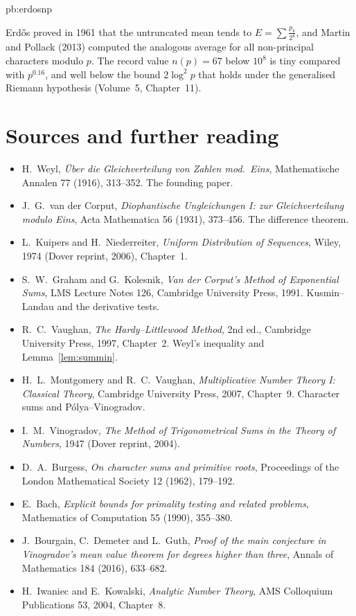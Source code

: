 \begin{solution}{pb:erdosnp}

\leads Erd\H os proved in 1961 that the untruncated mean tends to $E=\sum\frac{p_k}{2^k}$, and Martin and Pollack (2013) computed the analogous average for all non-principal characters
modulo $p$. The record value $n(p)=67$ below $10^8$ is tiny compared with $p^{0.16}$, and well below the bound $2\log^2p$ that holds under the generalised Riemann hypothesis
(Volume~5, Chapter~11).
\end{solution}

\section*{Sources and further reading}

\begin{itemize}
\item H.~Weyl, \emph{Über die Gleichverteilung von Zahlen mod.\ Eins}, Mathematische Annalen 77 (1916), 313--352. The founding paper.
\item J.~G.~van der Corput, \emph{Diophantische Ungleichungen I: zur Gleichverteilung modulo Eins}, Acta Mathematica 56 (1931), 373--456. The difference theorem.
\item L.~Kuipers and H.~Niederreiter, \emph{Uniform Distribution of Sequences}, Wiley, 1974 (Dover reprint, 2006), Chapter~1.
\item S.~W.~Graham and G.~Kolesnik, \emph{Van der Corput's Method of Exponential Sums}, LMS Lecture Notes 126, Cambridge University Press, 1991. Kusmin--Landau and the derivative tests.
\item R.~C.~Vaughan, \emph{The Hardy--Littlewood Method}, 2nd ed., Cambridge University Press, 1997, Chapter~2. Weyl's inequality and Lemma~\ref{lem:summin}.
\item H.~L.~Montgomery and R.~C.~Vaughan, \emph{Multiplicative Number Theory I: Classical Theory}, Cambridge University Press, 2007, Chapter~9. Character sums and Pólya--Vinogradov.
\item I.~M.~Vinogradov, \emph{The Method of Trigonometrical Sums in the Theory of Numbers}, 1947 (Dover reprint, 2004).
\item D.~A.~Burgess, \emph{On character sums and primitive roots}, Proceedings of the London Mathematical Society 12 (1962), 179--192.
\item E.~Bach, \emph{Explicit bounds for primality testing and related problems}, Mathematics of Computation 55 (1990), 355--380.
\item J.~Bourgain, C.~Demeter and L.~Guth, \emph{Proof of the main conjecture in Vinogradov's mean value theorem for degrees higher than three}, Annals of Mathematics 184 (2016), 633--682.
\item H.~Iwaniec and E.~Kowalski, \emph{Analytic Number Theory}, AMS Colloquium Publications 53, 2004, Chapter~8.
\end{itemize}
